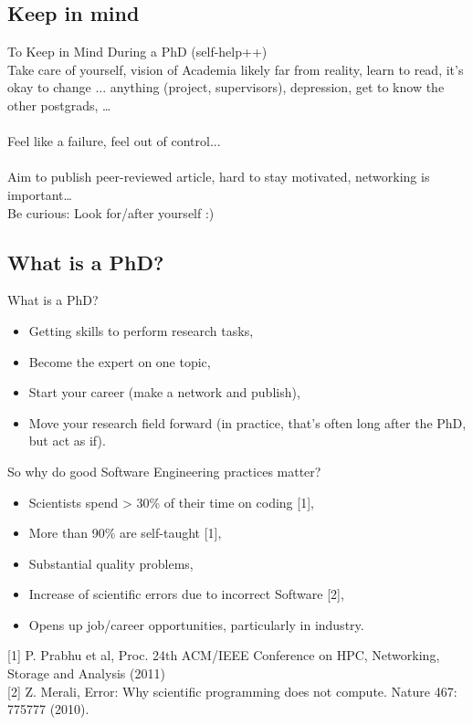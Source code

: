 \documentclass[]{beamer} %
\begin{document}
\subsection{Keep in mind}
\begin{frame}{To Keep in Mind During a PhD (self-help++)} 
\\
Take care of yourself, vision of Academia likely far from reality, learn to read, it's okay to change ... anything (project, supervisors), 
depression, get to know the other postgrads, \dots\\[3mm]
\\
Feel like a failure, feel out of control...\\[3mm]
\\
Aim to publish peer-reviewed article, hard to stay motivated, networking is important\dots\\[3mm]
Be curious: Look for/after yourself :)
\end{frame}


\subsection{What is a  PhD?}
\begin{frame}{What is a  PhD?}
\begin{itemize}
\item Getting skills to perform research tasks,
\item Become the expert on one topic,
\item Start your career (make a network and publish),
\item Move your research field forward (in practice, that's often long after the PhD, but act as if).
\end{itemize}
So why do good Software Engineering practices matter?\\
\pause
\begin{itemize}
\item Scientists spend > 30\% of their time on coding {\tiny{[1]}},
\item More than 90\% are self-taught {\tiny{[1]}},
\item Substantial quality problems,
\item Increase of scientific errors due to incorrect Software {\tiny{[2]}},
\item Opens up job/career opportunities, particularly in industry.
\end{itemize}
\tiny{[1] P. Prabhu et al, Proc. 24th ACM/IEEE Conference on HPC, Networking, Storage and Analysis (2011)}\\
\tiny{[2] Z. Merali, Error: Why scientific programming does not compute. Nature 467: 775777 (2010).}
\end{frame}
\end{document}
